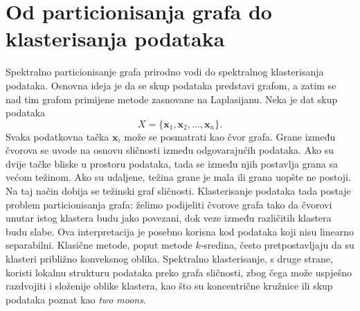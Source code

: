 \section{Od particionisanja grafa do klasterisanja podataka}
Spektralno particionisanje grafa prirodno vodi do spektralnog klasterisanja podataka. Osnovna ideja je da se skup podataka predstavi grafom, a zatim se nad tim grafom primijene metode zasnovane na Laplasijanu.
Neka je dat skup podataka
\[
    X = \{\mathbf{x}_1,\mathbf{x}_2,\ldots,\mathbf{x}_n\}.
\]
Svaka podatkovna tačka \(\mathbf{x}_i\) može se posmatrati kao čvor grafa. Grane između čvorova se uvode na osnovu sličnosti između odgovarajućih podataka. Ako su dvije tačke bliske u prostoru podataka, tada se između njih postavlja grana sa većom težinom. Ako su udaljene, težina grane je mala ili grana uopšte ne postoji.
Na taj način dobija se težinski graf sličnosti. Klasterisanje podataka tada postaje problem particionisanja grafa: želimo podijeliti čvorove grafa tako da čvorovi unutar istog klastera budu jako povezani, dok veze između različitih klastera budu slabe.
Ova interpretacija je posebno korisna kod podataka koji nisu linearno separabilni. Klasične metode, poput metode \(k\)-sredina, često pretpostavljaju da su klasteri približno konveksnog oblika. Spektralno klasterisanje, s druge strane, koristi lokalnu strukturu podataka preko grafa sličnosti, zbog čega može uspješno razdvojiti i složenije oblike klastera, kao što su koncentrične kružnice ili skup podataka poznat kao \textit{two moons}.

